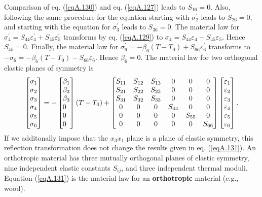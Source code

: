\documentclass{AeroStructure-ERJohnson}
\begin{document}
\noindent Comparison of eq. (\ref{eqA.130}) and eq. (\ref{eqA.127}) leads to $S_{16}=0$. Also, following the same procedure for the equation starting with $\sigma_{2}^{\prime}$ leads to $S_{26}=0$, and starting with the equation for $\sigma_{3}^{\prime}$ leads to $S_{36}=0$. The material law for $\sigma_{4}^{\prime}=S_{44} \varepsilon_{4}^{\prime}+S_{45} \varepsilon_{5}^{\prime}$ transforms by eq. (\ref{eqA.129}) to $\sigma_{4}=S_{44} \varepsilon_{4}-S_{45} \varepsilon_{5}$. Hence $S_{45}=0$. Finally, the material law for $\sigma_{6}^{\prime}=-\beta_{6}(T-T_{0})+S_{66} \varepsilon_{6}^{\prime}$ transforms to $-\sigma_{6}=-\beta_{6}(T-T_{0})- {S}_{66} \varepsilon_{6}$. Hence $\beta_{6}=0$. The material law for two orthogonal elastic planes of symmetry is
\begin{align}\label{eqA.131}
\left[\begin{array}{@{}l@{}}\sigma_{1} \\\sigma_{2} \\\sigma_{3} \\\sigma_{4} \\\sigma_{5} \\\sigma_{6}\end{array}\right]=-\left[\begin{array}{@{}l@{}}\beta_{1} \\\beta_{2} \\\beta_{3} \\0 \\0 \\0\end{array}\right](T-T_{0})+\left[\begin{array}{@{}cccccc@{}}S_{11} & S_{12} & S_{13} & 0 & 0 & 0 \\S_{21} & S_{22} & S_{23} & 0 & 0 & 0 \\S_{31} & S_{32} & S_{33} & 0 & 0 & 0 \\0 & 0 & 0 & S_{44} & 0 & 0 \\0 & 0 & 0 & 0 & S_{55} & 0 \\0 & 0 & 0 & 0 & 0 & S_{66}\end{array}\right]\left[\begin{array}{@{}l@{}}\varepsilon_{1} \\\varepsilon_{2} \\\varepsilon_{3} \\\varepsilon_{4} \\\varepsilon_{5} \\\varepsilon_{6}\end{array}\right].
\end{align}
If we additonally impose that the $x_{3} x_{1}$ plane is a plane of elastic symmetry, this reflection transformation does not change the results given in eq. (\ref{eqA.131}). An orthotropic material has three mutually orthogonal planes of elastic symmetry, nine independent elastic constants $S_{i j}$, and three independent thermal moduli. Equation (\ref{eqA.131}) is the material law for an \textbf{orthotropic} material (e.g., wood).
\end{document}
